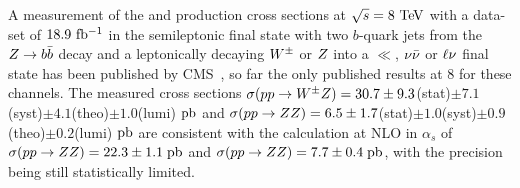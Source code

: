 A  measurement of the \WZ\; and \ZZ\; production cross sections 
at $\rts=8\TeV$ with a data-set of $18.9\mbox{\ fb$^{-1}$}$ 
in the semileptonic final state with two $b$-quark jets from the 
$Z\rightarrow b\bar{b}$ decay  
and a leptonically decaying $W^{\pm}$ or $Z$ into a $\ll$, $\nu\bar{\nu}$ or $\ell \nu$ final state 
has been published by CMS~\cite{Chatrchyan:2014aqa}, so 
far the only published results at 8 \TeV\; for these channels.
The measured cross sections 
$\sigma(pp\rightarrow W^{\pm}Z)=30.7\pm 9.3$(stat)$\pm 7.1$(syst)$\pm 4.1$(theo)$\pm 1.0$(lumi) $\mbox{pb}$
and
$\sigma(pp\rightarrow ZZ)=6.5\pm 1.7$(stat)$\pm 1.0$(syst)$\pm 0.9$(theo)$\pm 0.2$(lumi) $\mbox{pb}$ 
are consistent with the calculation at
NLO in $\alpha_s$ of 
$\sigma(pp\rightarrow ZZ) = 22.3\pm 1.1\;\mbox{pb}$ and $\sigma(pp\rightarrow ZZ)=7.7\pm 0.4\;\mbox{pb}$, 
with the precision being still statistically limited. 

% 







